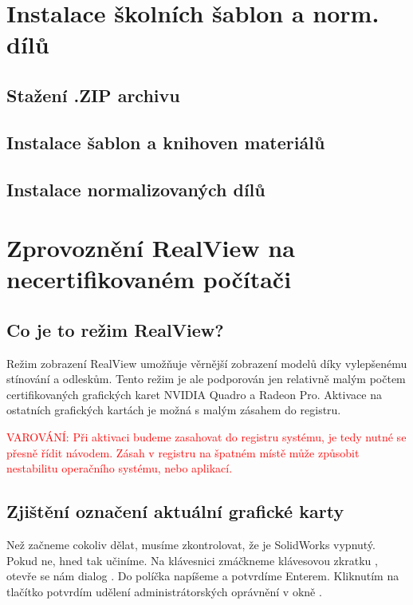 \section{Instalace školních šablon a norm. dílů}

\subsection*{Stažení .ZIP archivu}

\subsection*{Instalace šablon a knihoven materiálů}

\subsection*{Instalace normalizovaných dílů}


\section{Zprovoznění RealView na necertifikovaném počítači}
\subsection*{Co je to režim RealView?}
Režim zobrazení RealView umožňuje věrnější zobrazení modelů díky vylepšenému stínování a odleskům.
Tento režim je ale podporován jen relativně malým počtem certifikovaných grafických karet NVIDIA Quadro a Radeon Pro.
Aktivace na ostatních grafických kartách je možná s malým zásahem do registru.\newline

\noindent\textcolor{red}{VAROVÁNÍ: Při aktivaci budeme zasahovat do registru systému, je tedy nutné se přesně řídit návodem. Zásah v registru na špatném místě může způsobit nestabilitu operačního systému, nebo aplikací.}

\subsection*{Zjištění označení aktuální grafické karty}
Než začneme cokoliv dělat, musíme zkontrolovat, že je SolidWorks vypnutý. 
Pokud ne, hned tak učiníme.
Na klávesnici zmáčkneme klávesovou zkratku , otevře se nám dialog .
Do políčka napíšeme  a potvrdíme Enterem.
Kliknutím na tlačítko  potvrdím udělení administrátorských oprávnění v okně .

